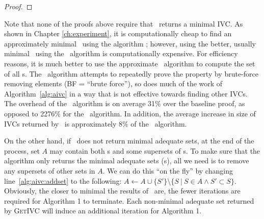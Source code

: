 \begin{proof}
%
%
%
\end{proof}

Note that none of the proofs above require that \getivc\ returns a minimal IVC.
As shown in Chapter \ref{ch:experiment}, it is computationally cheap to find an
approximately minimal \ivc\ using the algorithm \ucalg; however, using the better,
usually minimal \ivc\ using the \ucbfalg\ algorithm is computationally expensive.  For efficiency
reasons, it is much better to use the approximate \ucalg\ algorithm to compute the set of
all \mivc s.  The \ucbfalg\ algorithm attempts to repeatedly prove the property by brute-force removing elements (BF = ``brute force''), so does much of the work of Algorithm~\ref{alg:aivc} in a way that is not effective towards finding other IVCs.  The overhead of the \ucalg\ algorithm is on average 31\% over the baseline proof, as opposed to 2276\% for the \ucbfalg\ algorithm.  In addition, the average increase in size of IVCs returned by \ucalg\ is approximately 8\% of the \ucbfalg\ algorithm.

On the other hand, if \getivc ~does not return minimal adequate sets, at the end of the process,
set $A$ may contain both \mivc s and some supersets of \mivc s. To make sure that the algorithm only returns
the minimal adequate sets (\mivc s), all we need is to remove any supersets of other sets in $A$.  We can do this ``on the fly'' by changing
line~\ref{alg:aivc:addset} to the following:
$A \leftarrow A \cup \{S'\} \setminus \{ S~|~S \in A \wedge S' \subset S \}$.
Obviously, the closer to minimal the results of \getivc ~are,
the fewer iterations are required for Algorithm 1 to terminate.  Each non-minimal adequate set returned by \textsc{GetIVC} will induce an additional iteration for Algorithm 1.



%




